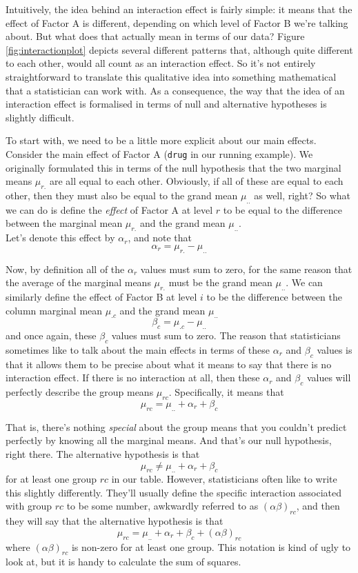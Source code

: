 \documentclass[
  11pt,
  a4paper,
  twoside,symmetric,openright]{book}
\theoremstyle{break}
\theoremstyle{break}
\begin{document}
Intuitively, the idea behind an interaction effect is fairly simple: it means that the effect of Factor A is different, depending on which level of Factor B we're talking about. But what does that actually mean in terms of our data? Figure \ref{fig:interactionplot} depicts several different patterns that, although quite different to each other, would all count as an interaction effect. So it's not entirely straightforward to translate this qualitative idea into something mathematical that a statistician can work with. As a consequence, the way that the idea of an interaction effect is formalised in terms of null and alternative hypotheses is slightly difficult.

To start with, we need to be a little more explicit about our main effects. Consider the main effect of Factor A (\texttt{drug} in our running example). We originally formulated this in terms of the null hypothesis that the two marginal means \(\mu_{r.}\) are all equal to each other. Obviously, if all of these are equal to each other, then they must also be equal to the grand mean \(\mu_{..}\) as well, right? So what we can do is define the \emph{effect} of Factor A at level \(r\) to be equal to the difference between the marginal mean \(\mu_{r.}\) and the grand mean \(\mu_{..}\).\\
Let's denote this effect by \(\alpha_r\), and note that
\[
\alpha_r  = \mu_{r.} - \mu_{..} 
\]

Now, by definition all of the \(\alpha_r\) values must sum to zero, for the same reason that the average of the marginal means \(\mu_{r.}\) must be the grand mean \(\mu_{..}\). We can similarly define the effect of Factor B at level \(i\) to be the difference between the column marginal mean \(\mu_{.c}\) and the grand mean \(\mu_{..}\)
\[
\beta_c = \mu_{.c} - \mu_{..}
\]
and once again, these \(\beta_c\) values must sum to zero. The reason that statisticians sometimes like to talk about the main effects in terms of these \(\alpha_r\) and \(\beta_c\) values is that it allows them to be precise about what it means to say that there is no interaction effect. If there is no interaction at all, then these \(\alpha_r\) and \(\beta_c\) values will perfectly describe the group means \(\mu_{rc}\). Specifically, it means that
\[
\mu_{rc} = \mu_{..} + \alpha_r + \beta_c 
\]

That is, there's nothing \emph{special} about the group means that you couldn't predict perfectly by knowing all the marginal means. And that's our null hypothesis, right there. The alternative hypothesis is that
\[
\mu_{rc} \neq \mu_{..} + \alpha_r + \beta_c 
\]
for at least one group \(rc\) in our table. However, statisticians often like to write this slightly differently. They'll usually define the specific interaction associated with group \(rc\) to be some number, awkwardly referred to as \((\alpha\beta)_{rc}\), and then they will say that the alternative hypothesis is that
\[\mu_{rc} = \mu_{..} + \alpha_r + \beta_c + (\alpha\beta)_{rc}\]
where \((\alpha\beta)_{rc}\) is non-zero for at least one group. This notation is kind of ugly to look at, but it is handy to calculate the sum of squares.
\end{document}
